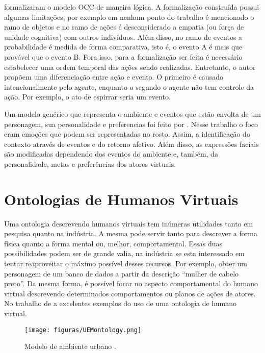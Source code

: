 \citet{adam2009alfototoe} formalizaram o modelo OCC de maneira lógica. A
formalização construída possui algumas limitações, por exemplo em nenhum ponto
do trabalho é mencionado o ramo de objetos e no ramo de ações é desconsiderado
a empatia (ou força de unidade cognitiva) com outros indivíduos. Além disso,
no ramo de eventos a probabilidade é medida de forma comparativa, isto é, o
evento A é mais que provável que o evento B. Fora isso, para a formalização
ser feita é necessário estabelecer uma ordem temporal das ações sendo
realizadas. Entretanto, o autor propõem uma diferenciação entre ação e evento.
O primeiro é causado intencionalmente pelo agente, enquanto o segundo o agente
não tem controle da ação. Por exemplo, o ato de espirrar seria um evento.

Um modelo genérico que representa o ambiente e eventos que estão envolta de um
personagem, sua personalidade e preferencias foi feito por
\citet{lera2009semantic}. Nesse trabalho o foco eram emoções
que podem ser representadas no rosto. Assim, a identificação do contexto
através de eventos e do retorno afetivo. Além disso, as expressões faciais são
modificadas dependendo dos eventos do ambiente e, também, da personalidade,
metas e preferências dos atores virtuais.


\section{Ontologias de Humanos Virtuais} \label{cap:eda:odhv}

Uma ontologia descrevendo humanos virtuais tem inúmeras utilidades tanto em
pesquisa quanto na indústria. A mesma pode servir tanto para descrever a forma
física quanto a forma mental ou, melhor, comportamental. Essas duas
possibilidades podem ser de grande valia, na indústria se esta interessado em
tentar reaproveitar o máximo possível desses recursos. Por exemplo, obter um
personagem de um banco de dados a partir da descrição ``mulher de cabelo
preto''. Da mesma forma, é possível focar no aspecto comportamental do humano
virtual descrevendo determinados comportamentos ou planos de ações de atores.
No trabalho de \citet{Gutierrez:2007:OVH:1229160.1229164} a excelentes
exemplos do uso de uma ontologia de humano virtual.

\begin{figure}[t]
  \centering
    \texttt{[image: figuras/UEMontology.png]}
  \caption{Modelo de ambiente urbano \cite{paiva2005ontology}.}
  \label{fig:UEM}
\end{figure}

